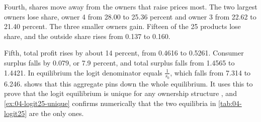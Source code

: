 Fourth, shares move away from the owners that raise prices most. The two largest owners lose share, owner 4
from 28.00 to 25.36 percent and owner 3 from 22.62 to 21.40 percent. The three smaller owners gain. Fifteen of the
25 products lose share, and the outside share rises from 0.137 to 0.160.

Fifth, total profit rises by about 14 percent, from 0.4616 to 0.5261. Consumer surplus falls by 0.079, or 7.9
percent, and total surplus falls from 1.4565 to 1.4421. In equilibrium the logit denominator equals
$\frac{1}{s_0}$, which falls from 7.314 to 6.246.  shows that this aggregate pins down
the whole equilibrium. It uses this to prove that the logit equilibrium is unique for any ownership structure
\citep{KonovalovSandor2010,NockeSchutz2018}, and \cref{ex:04-logit25-unique} confirms numerically that the two
equilibria in \cref{tab:04-logit25} are the only ones.
